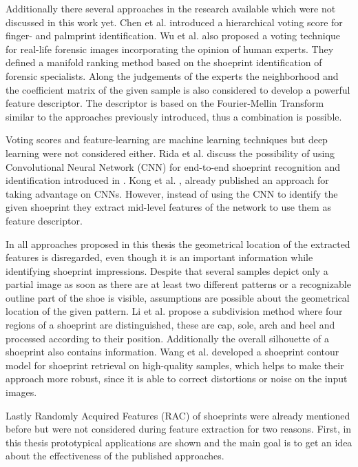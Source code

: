 \documentclass[draft,final]{vutinfth} %
\begin{document}
Additionally there several approaches in the research available which were not discussed in this work yet.
Chen et al. \cite{chen2013hierarchical} introduced a hierarchical voting score for finger- and palmprint identification.
Wu et al. \cite{wu2019losgsr} also proposed a voting technique for real-life forensic images incorporating the opinion of human experts.
They defined a manifold ranking method based on the shoeprint identification of forensic specialists.
Along the judgements of the experts the neighborhood and the coefficient matrix of the given sample is also considered to develop a powerful feature descriptor.
The descriptor is based on the Fourier-Mellin Transform similar to the approaches previously introduced, thus a combination is possible.
\par
Voting scores and feature-learning are machine learning techniques but deep learning \cite{lecun2015deep} were not considered either.
Rida et al. \cite{rida2019forensic} discuss the possibility of using Convolutional Neural Network (CNN) for end-to-end shoeprint recognition and identification introduced in \cite{lecun1998gradient}.
Kong et al. \cite{kong2017cross}, \cite{kong2019cross} already published an approach for taking advantage on CNNs.
However, instead of using the CNN to identify the given shoeprint they extract mid-level features of the network to use them as feature descriptor.
\par
In all approaches proposed in this thesis the geometrical location of the extracted features is disregarded, even though it is an important information while identifying shoeprint impressions.
Despite that several samples depict only a partial image as soon as there are at least two different patterns or a recognizable outline part of the shoe is visible, assumptions are possible about the geometrical location of the given pattern.
Li et al. \cite{li2015secondary} propose a subdivision method where four regions of a shoeprint are distinguished, these are cap, sole, arch and heel and processed according to their position.
Additionally the overall silhouette of a shoeprint also contains information.
Wang et al. \cite{wang2014automatic} developed a shoeprint contour model for shoeprint retrieval on high-quality samples, which helps to make their approach more robust, since it is able to correct distortions or noise on the input images.
\par
Lastly Randomly Acquired Features (RAC) of shoeprints were already mentioned before but were not considered during feature extraction for two reasons.
First, in this thesis prototypical applications are shown and the main goal is to get an idea about the effectiveness of the published approaches.
\end{document}
